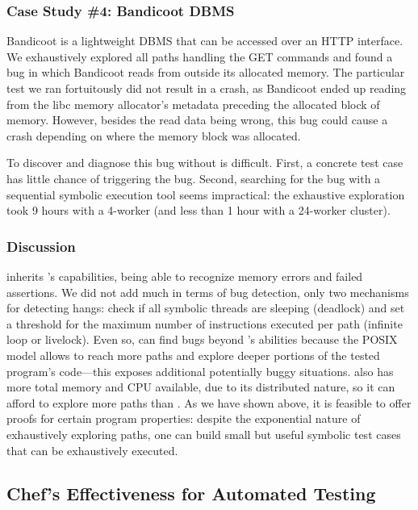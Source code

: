 \subsubsection{Case Study \#4: Bandicoot DBMS}
\label{sec:bandicoot}

Bandicoot is a lightweight DBMS that can be accessed over an HTTP interface.  We exhaustively explored all paths handling the GET commands and found a bug in which Bandicoot reads from outside its allocated memory.  The particular test we ran fortuitously did not result in a crash, as Bandicoot ended up reading from the libc memory allocator's metadata preceding the allocated block of memory. However, besides the read data being wrong, this bug could cause a crash depending on where the memory block was allocated.

To discover and diagnose this bug without \cnine is difficult. First, a concrete test case has little chance of triggering the bug.  Second, searching for the bug with a sequential symbolic execution tool seems impractical: the exhaustive exploration took 9 hours with a 4-worker \cnine (and less than 1 hour with a 24-worker cluster). 

\subsubsection{Discussion}

\cnine inherits \klee's capabilities, being able to recognize memory errors and failed assertions. We did not add much in terms of bug detection, only two mechanisms for detecting hangs: check if all symbolic threads are sleeping (deadlock) and set a threshold for the maximum number of instructions executed per path (infinite loop or livelock).  Even so, \cnine can find bugs beyond \klee's abilities because the POSIX model allows \cnine to reach more paths and explore deeper portions of the tested program's code---this exposes additional potentially buggy situations. \cnine also has more total memory and CPU available, due to its distributed nature, so it can afford to explore more paths than \klee.  As we have shown above, it is feasible to offer proofs for certain program properties: despite the exponential nature of exhaustively exploring paths, one can build small but useful symbolic test cases that can be exhaustively executed.

\subsection{Chef's Effectiveness for Automated Testing}

